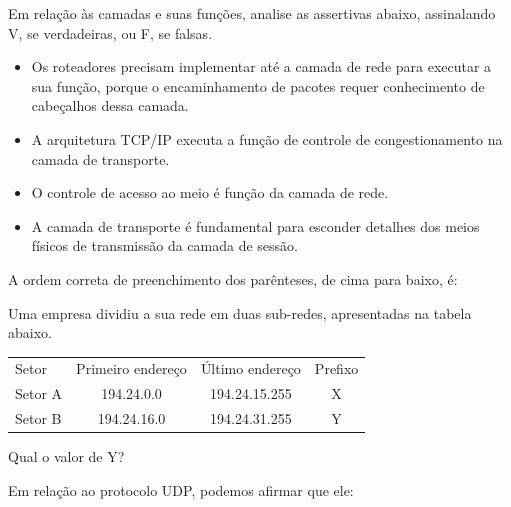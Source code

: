 \documentclass[10pt,a4paper]{article}
\begin{document}
%
{
\def\AMCbeginQuestion#1#2{\par\noindent{\bf (POSCOMP 2022 - Questão 54)}}
\begin{question}{} Em relação às camadas e suas funções, analise as assertivas abaixo, assinalando V, se verdadeiras, ou F, se falsas.
\begin{itemize}[label={( )}]
\item Os roteadores precisam implementar até a camada de rede para executar a sua função, porque o encaminhamento de pacotes requer conhecimento de cabeçalhos dessa camada.
\item A arquitetura TCP/IP executa a função de controle de congestionamento na camada de transporte.
\item O controle de acesso ao meio é função da camada de rede.
\item A camada de transporte é fundamental para esconder detalhes dos meios físicos de transmissão da camada de sessão.
\end{itemize}
A ordem correta de preenchimento dos parênteses, de cima para baixo, é:
\begin{choices}
\end{choices}
\end{question}
}
%
{
\def\AMCbeginQuestion#1#2{\par\noindent{\bf (POSCOMP 2022 - Questão 60)}}
\begin{question}{} Uma empresa dividiu a sua rede em duas sub-redes, apresentadas na tabela abaixo.
\begin{center}
\begin{tabular}{lccc}
Setor & Primeiro endereço & Último endereço & Prefixo \\
Setor A & 194.24.0.0 & 194.24.15.255 & X \\
Setor B & 194.24.16.0 & 194.24.31.255 & Y
\end{tabular}
\end{center}
Qual o valor de Y?
\begin{choices}
\end{choices}
\end{question}
}
%
{
\def\AMCbeginQuestion#1#2{\par\noindent{\bf (POSCOMP 2022 - Questão 65)}}
\begin{question}{} Em relação ao protocolo UDP, podemos afirmar que ele:
\begin{choices}
\end{choices}
\end{question}
}
\end{document}
